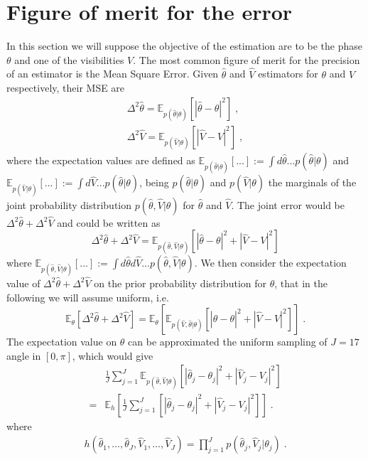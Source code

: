\documentclass[aps, pra, 10pt, twocolumn, superscriptaddress,floatfix]{revtex4-1}
\begin{document}
\section{Figure of merit for the error}
\label{sec:precision}
%
In this section we will suppose the objective of the estimation are to be the phase $\theta$ and one of the visibilities $V$. The most common figure of merit for the precision of an estimator is the Mean Square Error. Given $\hat{\theta}$ and $\hat{V}$ estimators for $\theta$ and $V$ respectively, their MSE are
%
\begin{eqnarray}
	\Delta^2 \hat{\theta} = \mathbb{E}_{p(\hat{\theta} | \theta)} [|\hat{\theta}-\theta|^2] \; , \\
	\Delta^2 \hat{V} = \mathbb{E}_{p(\hat{V}|\theta)} [|\hat{V}-V|^2] \; ,
\end{eqnarray}
%
where the expectation values are defined as  $\mathbb{E}_{p(\hat{\theta} | \theta)} [...]  := \int d \hat{\theta} ... p(\hat{\theta} | \theta)$ and $\mathbb{E}_{p(\hat{V} | \theta)} [...]  := \int d \hat{V} ... p(\hat{\theta}|\theta)$, being $p(\hat{\theta}|\theta)$ and $p(\hat{V}|\theta)$ the marginals of the joint probability distribution $p(\hat{\theta}, \hat{V}|\theta)$ for $\hat{\theta}$ and $\hat{V}$. The joint error would be $\Delta^2 \hat{\theta} + \Delta^2 \hat{V}$ and could be written as
%
\begin{equation}
	\Delta^2 \hat{\theta} + \Delta^2 \hat{V} = \mathbb{E}_{p(\hat{\theta}, \hat{V}| \theta)} [|\hat{\theta}-\theta|^2 + |\hat{V}-V|^2]
\end{equation}
%
where $\mathbb{E}_{p(\hat{\theta}, \hat{V}| \theta)} [...]  := \int d \hat{\theta} d \hat{V} ... p(\hat{\theta}, \hat{V} | \theta)$. We then consider the expectation value of $	\Delta^2 \hat{\theta} + \Delta^2 \hat{V}$ on the prior probability distribution for $\theta$, that in the following we will assume uniform, i.e.
%
\begin{equation}
	\mathbb{E}_\theta[\Delta^2 \hat{\theta} + \Delta^2 \hat{V}] = \mathbb{E}_\theta \left[ \mathbb{E}_{p(\hat{V}, \hat{\theta}|\theta)} [|\hat{\theta}-\theta|^2 + |\hat{V}-V|^2] \right] \; .
\end{equation}
%
The expectation value on $\theta$ can be approximated the uniform sampling of $J = 17$ angle in $[0, \pi]$, which would give
%
\begin{eqnarray}
	&\frac{1}{J} \sum_{j=1}^J \mathbb{E}_{p(\hat{\theta}, \hat{V} | \theta)} [|\hat{\theta}_j-\theta_j|^2 + |\hat{V}_j-V_j|^2] \\ = 
	&\mathbb{E}_{h} \left[ \frac{1}{J} \sum_{j=1}^J  [|\hat{\theta}_j-\theta_j|^2 + |\hat{V}_j-V_j|^2] \right]  \; .
	\label{eq:hmean}
\end{eqnarray}
%
where 
%
\begin{eqnarray}
	h(\hat{\theta}_1, \dots, \hat{\theta}_J, \hat{V}_1, \dots, \hat{V}_J) = \prod_{j=1}^J p(\hat{\theta}_j, \hat{V}_j | \theta_j) \; .
	\label{eq:hdistr}
\end{eqnarray}
%
\end{document}
